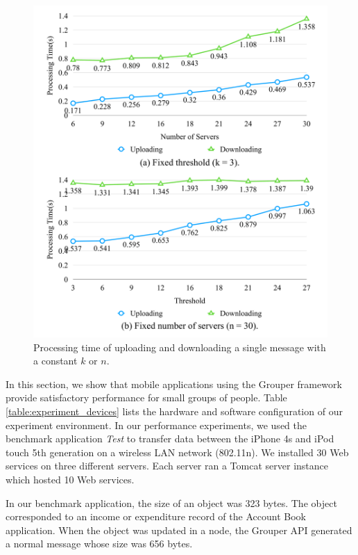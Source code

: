 \documentclass[a4paper,11pt]{report}
\begin{document}
\begin{figure}[t]
	\centering
	\includegraphics[scale=0.15]{constant_k_n}
	\caption{Processing time of uploading and downloading a single message with a constant ${k}$ or ${n}$.}
	\label{fig:processing_time_constant_k_n}
\end{figure}

In this section, we show that mobile applications using the Grouper framework provide satisfactory performance for small groups of people.
Table \ref{table:experiment_devices} lists the hardware and software configuration of our experiment environment.
In our performance experiments, we used the benchmark application \emph{Test} to transfer data between the iPhone 4s and iPod touch 5th generation on a wireless LAN network (802.11n).
We installed 30 Web services on three different servers.
Each server ran a Tomcat server instance which hosted 10 Web services.

In our benchmark application, the size of an object was 323 bytes.
The object corresponded to an income or expenditure record of the Account Book application.
When the object was updated in a node, the Grouper API generated a normal message whose size was 656 bytes.
\end{document}
